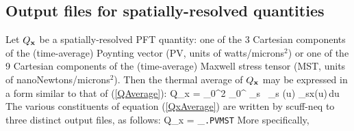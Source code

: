 \documentclass[letterpaper]{article}
\begin{document}
\newpage
\subsection{Output files for spatially-resolved quantities}

Let $Q_{\mathbf{x}}$ be a spatially-resolved PFT quantity:
one of the 3 Cartesian components of the (time-average)
Poynting vector (PV, units of watts/microns$^2$) or
one of the 9 Cartesian components of the (time-average)
Maxwell stress tensor (MST, units of nanoNewtons/microns$^2$).
Then the thermal average of $Q_{\mathbf{x}}$ may be expressed in a form
similar to that of (\ref{QAverage}):
{
 \qquad \big\langle Q_{\vb x}\big\rangle
 = \hbar \omega_0^2
   \int_0^\infty 
   \sum_s \, \Delta \wh \Theta_s (u) \Phi{}_{s\to\vb x}(u)\,du
}
The various constituents of equation (\ref{QxAverage}) are written
by {\sc scuff-neq} to three distinct output files, as follows:
{
 \qquad \big\langle Q_{\vb x}\big\rangle
 =
   _{\texttt{.PVMST}}
}
More specifically, 
\end{document}
